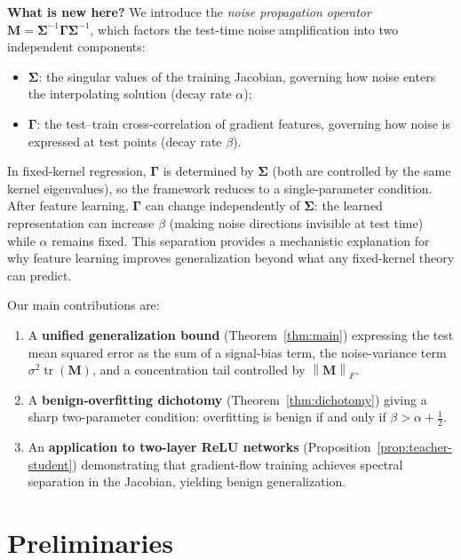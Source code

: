 \documentclass[12pt]{amsart}
\theoremstyle{definition}
\theoremstyle{remark}
\DeclareMathOperator{\tr}{tr}
\newcommand{\bM}{\mathbf{M}}
\newcommand{\norm}[1]{\left\lVert #1 \right\rVert}
\begin{document}
\medskip
\noindent\textbf{What is new here?}
We introduce the \emph{noise propagation operator}
$\bM = \boldsymbol{\Sigma}^{-1}\boldsymbol{\Gamma}\boldsymbol{\Sigma}^{-1}$,
which factors the test-time noise amplification into two independent
components:
\begin{itemize}
  \item $\boldsymbol{\Sigma}$: the singular values of the training Jacobian,
    governing how noise enters the interpolating solution (decay rate $\alpha$);
  \item $\boldsymbol{\Gamma}$: the test--train cross-correlation of gradient
    features, governing how noise is expressed at test points (decay rate
    $\beta$).
\end{itemize}
In fixed-kernel regression, $\boldsymbol{\Gamma}$ is determined by
$\boldsymbol{\Sigma}$ (both are controlled by the same kernel eigenvalues), so
the framework reduces to a single-parameter condition.  After feature learning,
$\boldsymbol{\Gamma}$ can change independently of $\boldsymbol{\Sigma}$: the
learned representation can increase $\beta$ (making noise directions invisible
at test time) while $\alpha$ remains fixed.  This separation provides a
mechanistic explanation for why feature learning improves generalization beyond
what any fixed-kernel theory can predict.

Our main contributions are:
\begin{enumerate}
  \item A \textbf{unified generalization bound} (Theorem~\ref{thm:main})
    expressing the test mean squared error as the sum of a signal-bias term, the
    noise-variance term $\sigma^{2}\tr(\bM)$, and a concentration tail
    controlled by $\norm{\bM}_{F}$.
  \item A \textbf{benign-overfitting dichotomy} (Theorem~\ref{thm:dichotomy})
    giving a sharp two-parameter condition: overfitting is benign if and only if
    $\beta > \alpha + \tfrac{1}{2}$.
  \item An \textbf{application to two-layer ReLU networks}
    (Proposition~\ref{prop:teacher-student}) demonstrating that gradient-flow
    training achieves spectral separation in the Jacobian, yielding benign
    generalization.
\end{enumerate}

\section{Preliminaries}\label{sec:prelim}
\end{document}
